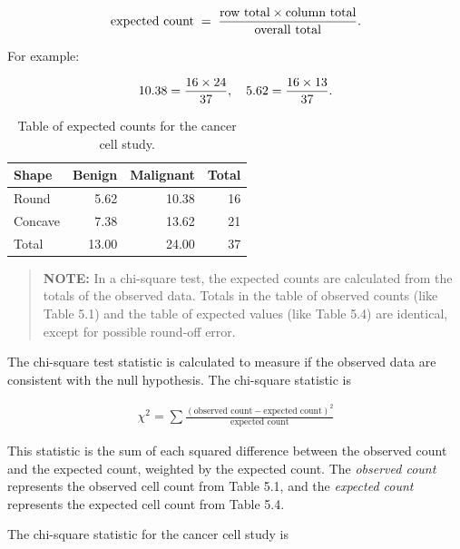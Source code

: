 \documentclass[
]{report}
\begin{document}
\begin{align}
\text{expected count} \;=\; \frac{\text{row total} \times \text{column total}}{\text{overall total}}.
\notag
\end{align}

For example:

\begin{align}
10.38 = \frac{16 \times 24}{37}, \notag
\quad
5.62 = \frac{16 \times 13}{37}. \notag
\end{align}

\begin{table}

\caption{\label{tab:tab54}Table of expected counts for the cancer cell study.}
\centering
\begin{tabular}[t]{lrrr}
\toprule
Shape & Benign & Malignant & Total\\
\midrule
Round & 5.62 & 10.38 & 16\\
Concave & 7.38 & 13.62 & 21\\
Total & 13.00 & 24.00 & 37\\
\bottomrule
\end{tabular}
\end{table}

\begin{quote}
\textbf{NOTE:} In a chi-square test, the expected counts are calculated from the totals of the observed data. Totals in the table of observed counts (like Table 5.1) and the table of expected values (like Table 5.4) are identical, except for possible round-off error.\\
\normalsize
\end{quote}

The chi-square test statistic is calculated to measure if the observed data are consistent with the null hypothesis. The chi-square statistic is

\begin{align} \label{5.3}
\chi^2 = \sum \frac{(\text{observed count} - \text{expected count})^2}{\text{expected count}} 
\tag{5.3}
\end{align}

This statistic is the sum of each squared difference between the observed count and the expected count, weighted by the expected count. The \emph{observed count} represents the observed cell count from Table 5.1, and the \emph{expected count} represents the expected cell count from Table 5.4.

The chi-square statistic for the cancer cell study is
\end{document}
